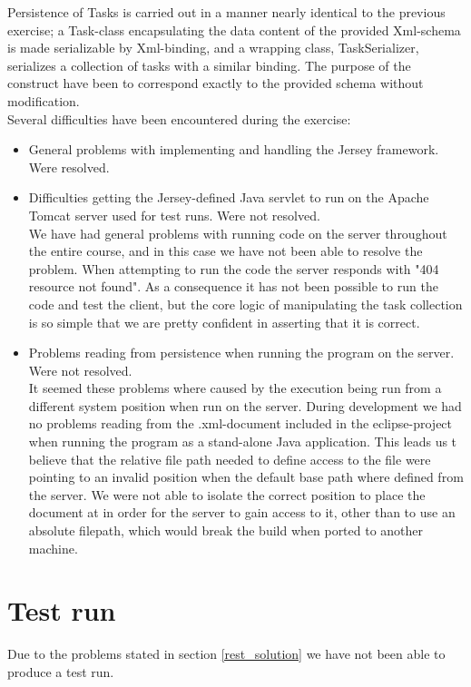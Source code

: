 Persistence of Tasks is carried out in a manner nearly identical to the previous exercise; a Task-class encapsulating the data content of the provided Xml-schema is made serializable by Xml-binding, and a wrapping class, TaskSerializer, serializes a collection of tasks with a similar binding. The purpose of the construct have been to correspond exactly to the provided schema without modification.\\

Several difficulties have been encountered during the exercise:
\begin{itemize}
	\item General problems with implementing and handling the Jersey framework. Were resolved.
	\item Difficulties getting the Jersey-defined Java servlet to run on the Apache Tomcat server used for test runs. Were not resolved.\\
	We have had general problems with running code on the server throughout the entire course, and in this case we have not been able to resolve the problem. When attempting to run the code the server responds with "404 resource not found". As a consequence it has not been possible to run the code and test the client, but the core logic of manipulating the task collection is so simple that we are pretty confident in asserting that it is correct.
	\item Problems reading from persistence when running the program on the server. Were not resolved.\\
	It seemed these problems where caused by the execution being run from a different system position when run on the server. During development we had no problems reading from the .xml-document included in the eclipse-project when running the program as a stand-alone Java application. This leads us t believe that the relative file path needed to define access to the file were pointing to an invalid position when the default base path where defined from the server. We were not able to isolate the correct position to place the document at in order for the server to gain access to it, other than to use an absolute filepath, which would break the build when ported to another machine.
\end{itemize}
\section{Test run}
\label{rest_test}
	Due to the problems stated in section \ref{rest_solution} we have not been able to produce a test run.
